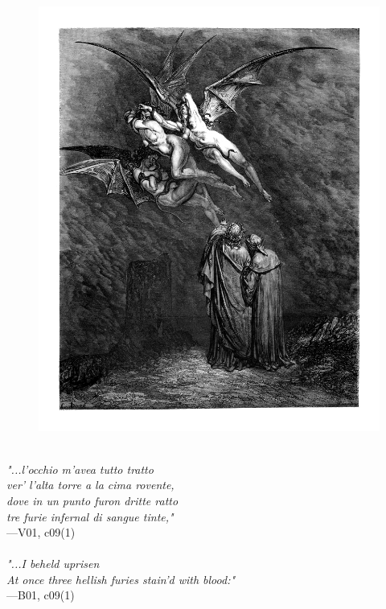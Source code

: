 \documentclass[../Dore_vision.tex]{subfiles}
\begin{document}
\begin{figure}[ht]
\centering
\includegraphics[height=\figsize]{illustrations/book_1/V01, c09(1).jpg}
\end{figure}

\begin{center}
\begin{minipage}{0.8\linewidth}
\textit{\\
"...l’occhio m’avea tutto tratto\\ver’ l’alta torre a la cima rovente,\\dove in un punto furon dritte ratto\\tre furie infernal di sangue tinte,"} \\
—V01, c09(1) \\~\\
\textit{"...I beheld uprisen\\At once three hellish furies stain'd with blood:"} \\
—B01, c09(1)
\end{minipage}
\end{center}
\end{document}
